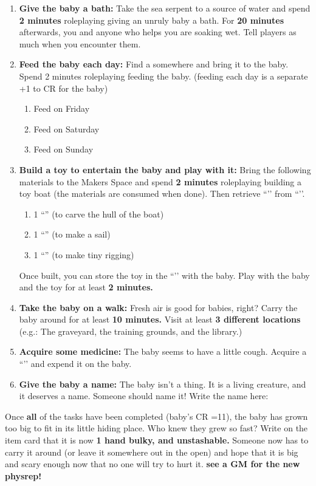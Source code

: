 \documentclass[green]{GL2020}
\begin{document}
\begin{enumerate}
  \item \textbf{Give the baby a bath:} Take the sea serpent to a source of water and spend \textbf{2 minutes} roleplaying giving an unruly baby a bath. For \textbf{20 minutes} afterwards, you and anyone who helps you are soaking wet. Tell players as much when you encounter them.
  \item \textbf{Feed the baby each day:} Find a \iFish{\MYname} somewhere and bring it to the baby. Spend 2 minutes roleplaying feeding the baby. (feeding each day is a separate +1 to CR for the baby)
  \begin{enumerate}
    \item Feed on Friday
    \item Feed on Saturday
    \item Feed on Sunday
  \end{enumerate}
  \item \textbf{Build a toy to entertain the baby and play with it:} Bring the following materials to the Makers Space and spend \textbf{2 minutes} roleplaying building a toy boat (the materials are consumed when done). Then retrieve ``\iToyBoat{}’’ from ``\sSignH{}’’.
  \begin{enumerate}
    \item 1 ``\iWoodenBlock{}'' (to carve the hull of the boat)
    \item 1 ``\iEagleFeather{}'' (to make a sail)
    \item 1 ``\iSpiderWeb{}'' (to make tiny rigging)
  \end{enumerate}
  Once built, you can store the toy in the ``\sStudentBookCaseTwo{}’’ with the baby. Play with the baby and the toy for at least \textbf{2 minutes.}
  \item \textbf{Take the baby on a walk:} Fresh air is good for babies, right? Carry the baby around for at least \textbf{10 minutes.} Visit at least \textbf{3 different locations} (e.g.: The graveyard, the training grounds, and the library.)
  \item \textbf{Acquire some medicine:} The baby seems to have a little cough. Acquire a ``\iStrength{}’’ and expend it on the baby.
  \item \textbf{Give the baby a name:} The baby isn’t a thing. It is a living creature, and it deserves a name. Someone should name it! Write the name here: \underline{\hspace{2cm}}
\end{enumerate}

Once \textbf{all} of the tasks have been completed (baby’s CR =11), the baby has grown too big to fit in its little hiding place. Who knew they grew so fast? Write on the item card that it is now \textbf{1 hand bulky, and unstashable.} Someone now has to carry it around (or leave it somewhere out in the open) and hope that it is big and scary enough now that no one will try to hurt it. \textbf{see a GM for the new physrep!}
\end{document}
